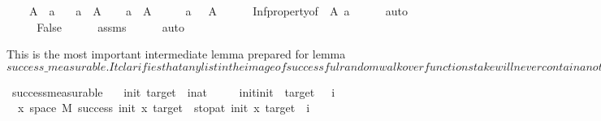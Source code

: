 \begin{isabellebody}
\ \ \ {\isachardoublequoteopen}{\isasymSqinter}\ A\ {\isachargreater}{\kern0pt}\ a{\isachardoublequoteclose}\isanewline
\ \ \ {\isachardoublequoteopen}a\ {\isasymnotin}\ A{\isachardoublequoteclose}\isanewline
%
\isadelimproof
%
\endisadelimproof
%
\isatagproof
{}\isamarkupfalse%
\isanewline
\ \ \isamarkupfalse%
\ {\isachardoublequoteopen}a\ {\isasymin}\ A{\isachardoublequoteclose}\isanewline
\ \ \isamarkupfalse%
\ \isamarkupfalse%
\ {\isachardoublequoteopen}a\ {\isasymge}\ {\isasymSqinter}\ A{\isachardoublequoteclose}\isanewline
\ \ \ \ \isamarkupfalse%
\ Inf{\isacharunderscore}{\kern0pt}property{\isacharbrackleft}{\kern0pt}of\ {\isacharunderscore}{\kern0pt}\ A\ a{\isacharbrackright}{\kern0pt}\isanewline
\ \ \ \ \isamarkupfalse%
\ auto\isanewline
\ \ \isamarkupfalse%
\ \isamarkupfalse%
\ False\isanewline
\ \ \ \ \isamarkupfalse%
\ assms\isanewline
\ \ \ \ \isamarkupfalse%
\ auto\isanewline
{}\isamarkupfalse%
%
\endisatagproof
{\isafoldproof}%
%
\isadelimproof
%
\endisadelimproof
%
\begin{isamarkuptext}%
This is the most important intermediate lemma prepared for lemma $success\_measurable. It clarifies
that any list in the image of successful random walk over function stake will never contain another 
shorter list corresponding to another successful random walk$%
\end{isamarkuptext}\isamarkuptrue%
\isamarkupfalse%
\ success{\isacharunderscore}{\kern0pt}measurable{}{\isacharcolon}{\kern0pt}\isanewline
\ \ \ init\ target\ \ i{\isacharcolon}{\kern0pt}{\isacharcolon}{\kern0pt}nat\isanewline
\ \ \ {\isachardoublequoteopen}{}\ {\isacharless}{\kern0pt}\ init{\isachardoublequoteclose}{\isachardoublequoteopen}init\ {\isacharless}{\kern0pt}\ target{\isachardoublequoteclose}\ {\isachardoublequoteopen}{}\ {\isasymle}\ i{\isachardoublequoteclose}\isanewline
\ \ x{\isasymin}\ space\ M{\isachardot}{\kern0pt}\ success\ init\ x\ target\ {\isasymand}\ stop{\isacharunderscore}{\kern0pt}at\ init\ x\ target\ {\isacharequal}{\kern0pt}\ i{\isacharbraceright}{\kern0pt}\isanewline

\end{isabellebody}

